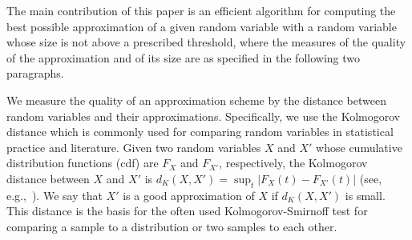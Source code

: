\documentclass[letterpaper]{article} %
\begin{document}
The main contribution of this paper is an efficient algorithm for computing the best possible approximation of a given random variable with a random variable whose size is not above a prescribed threshold, where the measures of the quality of the approximation and of its size are as specified in the following two paragraphs. 



We measure the quality of an approximation scheme by the distance between random variables and their approximations. Specifically, we use the Kolmogorov distance which is  commonly used for comparing random variables in statistical practice and literature. Given two random variables $X$ and $X'$ whose cumulative distribution functions (cdf) are $F_X$ and $F_{X'}$, respectively, the Kolmogorov distance between $X$ and $X'$ is $d_K(X,X')= \sup_t |F_X(t) - F_{X'}(t)|$ (see, e.g.,~\cite{gibbons2011nonparametric}). We say that $X'$ is a good approximation of $X$ if $d_K(X,X')$ is small. This distance is the basis for the often used Kolmogorov-Smirnoff test for comparing a sample to a distribution or two samples to each other. 
\end{document}
